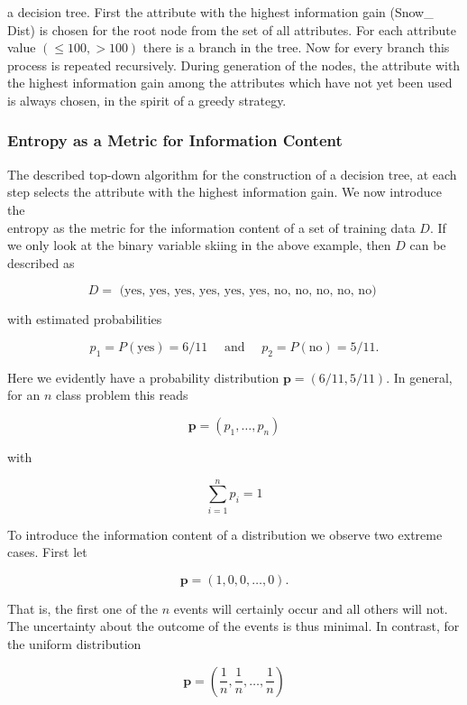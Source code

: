 \documentclass[10pt]{book}
\begin{document}
a decision tree. First the attribute with the highest information gain (Snow\_ Dist) is chosen for the root node from the set of all attributes. For each attribute value $(\leq 100,>100)$ there is a branch in the tree. Now for every branch this process is repeated recursively. During generation of the nodes, the attribute with the highest information gain among the attributes which have not yet been used is always chosen, in the spirit of a greedy strategy.


\subsubsection*{Entropy as a Metric for Information Content}
The described top-down algorithm for the construction of a decision tree, at each step selects the attribute with the highest information gain. We now introduce the\\
entropy as the metric for the information content of a set of training data $D$. If we only look at the binary variable skiing in the above example, then $D$ can be described as

$$
D=\text { (yes, yes, yes, yes, yes, yes, no, no, no, no, no) }
$$

with estimated probabilities

$$
p_{1}=P(\mathrm{yes})=6 / 11 \quad \text { and } \quad p_{2}=P(\mathrm{no})=5 / 11 .
$$

Here we evidently have a probability distribution $\boldsymbol{p}=(6 / 11,5 / 11)$. In general, for an $n$ class problem this reads

$$
\boldsymbol{p}=\left(p_{1}, \ldots, p_{n}\right)
$$

with

$$
\sum_{i=1}^{n} p_{i}=1
$$

To introduce the information content of a distribution we observe two extreme cases. First let


\begin{equation*}
\boldsymbol{p}=(1,0,0, \ldots, 0) . \tag{8.4}
\end{equation*}


That is, the first one of the $n$ events will certainly occur and all others will not. The uncertainty about the outcome of the events is thus minimal. In contrast, for the uniform distribution


\begin{equation*}
\boldsymbol{p}=\left(\frac{1}{n}, \frac{1}{n}, \ldots, \frac{1}{n}\right) \tag{8.5}
\end{equation*}
\end{document}

